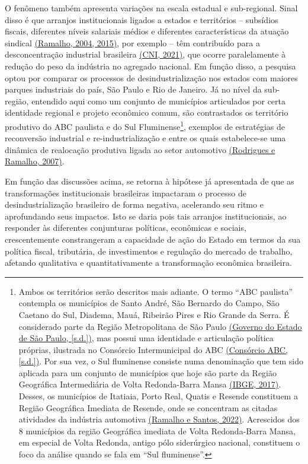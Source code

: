 O fenômeno também apresenta variações na escala estadual e sub-regional.
Sinal disso é que arranjos institucionais ligados a estados e
territórios -- subsídios fiscais, diferentes níveis salariais médios e
diferentes características da atuação sindical
\href{https://www.zotero.org/google-docs/?gbGa0G}{(Ramalho, 2004,
2015)}, por exemplo -- têm contribuído para a desconcentração industrial
brasileira \href{https://www.zotero.org/google-docs/?qvqIuo}{(CNI,
2021)}, que ocorre paralelamente à redução do peso da indústria no
agregado nacional. Em função disso, a pesquisa optou por comparar os
processos de desindustrialização nos estados com maiores parques
industriais do país, São Paulo e Rio de Janeiro. Já no nível da
sub-região, entendido aqui como um conjunto de municípios articulados
por certa identidade regional e projeto econômico comum, são
contrastados os território produtivo do ABC paulista e do Sul
Fluminense\footnote{Ambos os territórios serão descritos mais adiante. O
  termo ``ABC paulista'' contempla os municípios de Santo André, São
  Bernardo do Campo, São Caetano do Sul, Diadema, Mauá, Ribeirão Pires e
  Rio Grande da Serra. É considerado parte da Região Metropolitana de
  São Paulo \href{https://www.zotero.org/google-docs/?Zpuw90}{(Governo
  do Estado de São Paulo, {[}s.d.{]})}, mas possui uma identidade e
  articulação política próprias, ilustrada no Consórcio Intermunicipal
  do ABC \href{https://www.zotero.org/google-docs/?JmJ6HS}{(Consórcio
  ABC, {[}s.d.{]})}. Por sua vez, o Sul fluminense consiste numa
  denominação que tem sido aplicada para um conjunto de municípios que
  hoje são parte da Região Geográfica Intermediária de Volta
  Redonda-Barra Mansa
  \href{https://www.zotero.org/google-docs/?A380nY}{(IBGE, 2017)}.
  Desses, os municípios de Itatiaia, Porto Real, Quatis e Resende
  constituem a Região Geográfica Imediata de Resende, onde se concentram
  as citadas atividades da indústria automotiva
  \href{https://www.zotero.org/google-docs/?9aZc1J}{(Ramalho e Santos,
  2022)}. Acrescidos dos 8 municípios da região Geográfica imediata de
  Volta Redonda-Barra Mansa, em especial de Volta Redonda, antigo pólo
  siderúrgico nacional, constituem o foco da análise quando se fala em
  ``Sul fluminense''.}, exemplos de estratégias de reconversão
industrial e re-industrialização e entre os quais estabelece-se uma
dinâmica de realocação produtiva ligada ao setor automotivo
\href{https://www.zotero.org/google-docs/?w7wz1h}{(Rodrigues e Ramalho,
2007)}.

Em função das discussões acima, se retorna à hipótese já apresentada de
que as transformações institucionais brasileiras impactaram o processo
de desindustrialização brasileiro de forma negativa, acelerando seu
ritmo e aprofundando seus impactos. Isto se daria pois tais arranjos
institucionais, ao responder às diferentes conjunturas políticas,
econômicas e sociais, crescentemente constrangeram a capacidade de ação
do Estado em termos da sua política fiscal, tributária, de investimentos
e regulação do mercado de trabalho, afetando qualitativa e
quantitativamente a transformação econômica brasileira.

